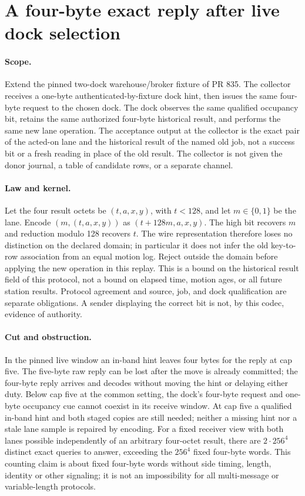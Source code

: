 \documentclass{article}
\begin{document}
\section*{A four-byte exact reply after live dock selection}
\paragraph{Scope.} Extend the pinned two-dock warehouse/broker fixture of
PR 835. The collector receives a one-byte authenticated-by-fixture dock hint,
then issues the same four-byte request to the chosen dock. The dock observes
the same qualified occupancy bit, retains the same authorized four-byte
historical result, and performs the same new lane operation. The acceptance
output at the collector is the exact pair of the acted-on lane and the
historical result of the named old job, not a success bit or a fresh reading
in place of the old result. The collector is not given the donor journal,
a table of candidate rows, or a separate channel.
\paragraph{Law and kernel.} Let the four result octets be $(t,a,x,y)$, with
$t<128$, and let $m\in\{0,1\}$ be the lane. Encode
$(m,(t,a,x,y))$ as $(t+128m,a,x,y)$. The high bit recovers $m$ and
reduction modulo 128 recovers $t$. The wire representation therefore loses
no distinction on the declared domain; in particular it does not infer the
old key-to-row association from an equal motion log. Reject outside the
domain before applying the new operation in this replay. This is a bound on
the historical result field of this protocol, not a bound on elapsed time,
motion ages, or all future station results. Protocol agreement and source,
job, and dock qualification are separate obligations. A sender displaying the
correct bit is not, by this codec, evidence of authority.
\paragraph{Cut and obstruction.} In the pinned live window an in-band
hint leaves four bytes for the reply at cap five. The five-byte raw reply
can be lost after the move is already committed; the four-byte reply arrives
and decodes without moving the hint or delaying either duty. Below cap five
at the common setting, the dock's four-byte request and one-byte occupancy
cue cannot coexist in its receive window. At cap five a qualified in-band
hint and both staged copies are still needed; neither a missing hint nor a
stale lane sample is repaired by encoding. For a fixed receiver view with
both lanes possible independently of an arbitrary four-octet result, there are
$2\cdot256^4$ distinct exact queries to answer, exceeding the $256^4$
fixed four-byte words. This counting claim is about fixed four-byte words
without side timing, length, identity or other signaling; it is not an
impossibility for all multi-message or variable-length protocols.
\end{document}
